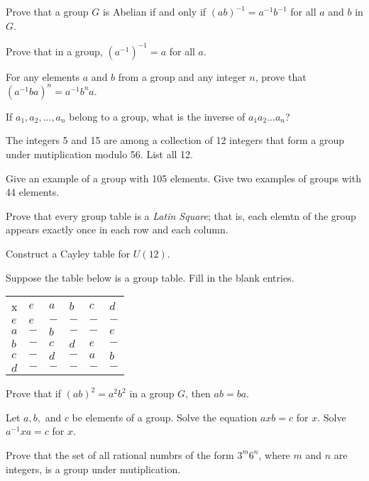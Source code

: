\documentclass[11pt,largemargins]{homework}
\begin{document}
\question
Prove that a group $G$ is Abelian if and only if $(ab)^{-1}=a^{-1}b^{-1}$ for all $a$ and $b$ in $G$.

\question
Prove that in a group, $(a^{-1})^{-1} = a$ for all $a$.

\question
For any elements $a$ and $b$ from a group and any integer $n$, prove that $(a^{-1}ba)^n=a^{-1}b^na$.

\question 
If $a_1,a_2,...,a_n$ belong to a group, what is the inverse of $a_1a_2...a_n$?

\question 
The integers 5 and 15 are among a collection of 12 integers that form a group under mutiplication modulo 56. 
List all 12.

\question 
Give an example of a group with 105 elements. Give two examples of groups with 44 elements.

\question 
Prove that every group table is a \textit{Latin Square}; that is, each elemtn of the group appears exactly once in each row and 
each column. 

\question 
Construct a Cayley table for $U(12)$.

\question 
Suppose the table below is a group table. Fill in the blank entries.

\centering
\begin{tabular}{llllll}
 x  & $e$ & $a$ & $b$ & $c$ & $d$ \\
$e$ & $e$ & $-$ & $-$ & $-$ & $-$ \\
$a$ & $-$ & $b$ & $-$ & $-$ & $e$ \\
$b$ & $-$ & $c$ & $d$ & $e$ & $-$ \\
$c$ & $-$ & $d$ & $-$ & $a$ & $b$ \\
$d$ & $-$ & $-$ & $-$ & $-$ & $-$
\end{tabular}

\raggedright

\question 
Prove that if $(ab)^2=a^2b^2$ in a group $G$, then $ab=ba$.

\question 
Let $a,b,$ and $c$ be elements of a group. Solve the equation $axb=c$ for $x$. Solve $a^{-1}xa=c$ for $x$.

\question 
Prove that the set of all rational numbrs of the form $3^m6^n$, where $m$ and $n$ are integers, is a group under mutiplication.
\end{document}
